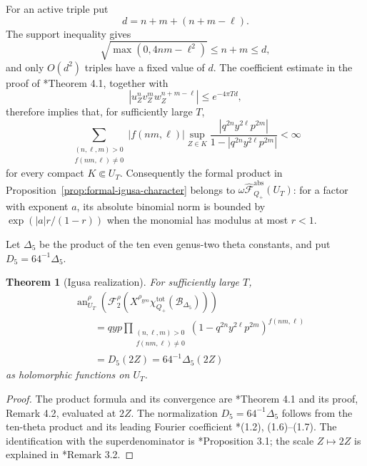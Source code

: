 \documentclass[11pt,reqno]{amsart}
\newtheorem{theorem}{Theorem}[section]
\theoremstyle{definition}
\theoremstyle{remark}
\begin{document}
For an active triple put
\[
 d=n+m+(n+m-\ell).
\]
The support inequality gives
\[
 \sqrt{\max(0,4nm-\ell^2)}\le n+m\le d,
\]
and only \(O(d^2)\) triples have a fixed value of \(d\).  The coefficient
estimate in the proof of \cite{GN97}*{Theorem 4.1}, together with
\[
 \left|u_Z^nv_Z^mw_Z^{n+m-\ell}\right|
 \le e^{-4\pi Td},
\]
therefore implies that, for sufficiently large \(T\),
\[
 \sum_{\substack{(n,\ell,m)>0\\ f(nm,\ell)\ne0}}
 |f(nm,\ell)|\sup_{Z\in K}
 \frac{|q^{2n}y^{2\ell}p^{2m}|}
      {1-|q^{2n}y^{2\ell}p^{2m}|}<\infty
\]
for every compact \(K\Subset U_T\).  Consequently the formal product
in Proposition~\ref{prop:formal-igusa-character} belongs to
\(\omega\widehat{\mathscr F}_{Q_+}^{\mathrm{abs}}(U_T)\): for a factor
with exponent \(a\), its absolute binomial norm is bounded by
\(\exp(|a|r/(1-r))\) when the monomial has modulus at most \(r<1\).

Let \(\Delta_5\) be the product of the ten even genus-two theta
constants, and put \(D_5=64^{-1}\Delta_5\).

\begin{theorem}[Igusa realization]
\label{thm:igusa-realization}
For sufficiently large \(T\),
\[
\begin{aligned}
 &\operatorname{an}_{U_T}^{\rho}\!\left(
 \mathcal F_2^\rho\!\left(
 X^{\rho_{\mathrm{geo}}}
 \chi_{Q_+}^{\mathrm{tot}}(\mathcal B_{\Delta_5})\right)\right)\\
 &\qquad =
 qyp\prod_{\substack{(n,\ell,m)>0\\ f(nm,\ell)\ne0}}
 \left(1-q^{2n}y^{2\ell}p^{2m}\right)^{f(nm,\ell)}\\
 &\qquad =D_5(2Z)=64^{-1}\Delta_5(2Z)
\end{aligned}
\]
as holomorphic functions on \(U_T\).
\end{theorem}

\begin{proof}
The product formula and its convergence are
\cite{GN97}*{Theorem 4.1 and its proof, Remark 4.2}, evaluated at
\(2Z\).  The normalization \(D_5=64^{-1}\Delta_5\) follows from the
ten-theta product and its leading Fourier coefficient
\cite{GN97}*{(1.2), (1.6)--(1.7)}.  The identification with the
superdenominator is \cite{GN97}*{Proposition 3.1}; the scale
\(Z\mapsto2Z\) is explained in \cite{GN97}*{Remark 3.2}.
\end{proof}
\end{document}
